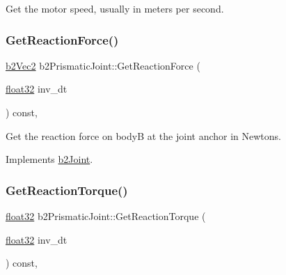 Get the motor speed, usually in meters per second. 

\mbox{\label{classb2_prismatic_joint_ad73abb0ea7e316e863c35f4179ebc7ab}} 
\subsubsection{\texorpdfstring{GetReactionForce()}{GetReactionForce()}}
{\footnotesize\ttfamily \mbox{\hyperlink{structb2_vec2}{b2\+Vec2}} b2\+Prismatic\+Joint\+::\+Get\+Reaction\+Force (\begin{DoxyParamCaption}\item[{\mbox{\hyperlink{b2_settings_8h_aacdc525d6f7bddb3ae95d5c311bd06a1}{float32}}}]{inv\+\_\+dt }\end{DoxyParamCaption}) const\hspace{0.3cm}{\ttfamily [override]}, {\ttfamily [virtual]}}



Get the reaction force on bodyB at the joint anchor in Newtons. 



Implements \mbox{\hyperlink{classb2_joint_a7e0eddefb9b69ad050b8ef6425838a74}{b2\+Joint}}.

\mbox{\label{classb2_prismatic_joint_a009526663c2ad848084103470375dc67}} 
\subsubsection{\texorpdfstring{GetReactionTorque()}{GetReactionTorque()}}
{\footnotesize\ttfamily \mbox{\hyperlink{b2_settings_8h_aacdc525d6f7bddb3ae95d5c311bd06a1}{float32}} b2\+Prismatic\+Joint\+::\+Get\+Reaction\+Torque (\begin{DoxyParamCaption}\item[{\mbox{\hyperlink{b2_settings_8h_aacdc525d6f7bddb3ae95d5c311bd06a1}{float32}}}]{inv\+\_\+dt }\end{DoxyParamCaption}) const\hspace{0.3cm}{\ttfamily [override]}, {\ttfamily [virtual]}}



